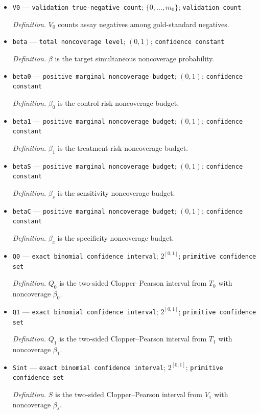 \documentclass{article}
\begin{document}
\begin{itemize}
  \item \texttt{V0} --- \texttt{validation true-\allowbreak{}negative count}; \(\{0,\ldots,m_0\}\); \texttt{validation count}
  \par\smallskip\noindent\emph{Definition.} \(V_0\) counts assay negatives among gold-standard negatives.
  \item \texttt{beta} --- \texttt{total noncoverage level}; \((0,1)\); \texttt{confidence constant}
  \par\smallskip\noindent\emph{Definition.} \(\beta\) is the target simultaneous noncoverage probability.
  \item \texttt{beta0} --- \texttt{positive marginal noncoverage budget}; \((0,1)\); \texttt{confidence constant}
  \par\smallskip\noindent\emph{Definition.} \(\beta_0\) is the control-risk noncoverage budget.
  \item \texttt{beta1} --- \texttt{positive marginal noncoverage budget}; \((0,1)\); \texttt{confidence constant}
  \par\smallskip\noindent\emph{Definition.} \(\beta_1\) is the treatment-risk noncoverage budget.
  \item \texttt{betaS} --- \texttt{positive marginal noncoverage budget}; \((0,1)\); \texttt{confidence constant}
  \par\smallskip\noindent\emph{Definition.} \(\beta_s\) is the sensitivity noncoverage budget.
  \item \texttt{betaC} --- \texttt{positive marginal noncoverage budget}; \((0,1)\); \texttt{confidence constant}
  \par\smallskip\noindent\emph{Definition.} \(\beta_c\) is the specificity noncoverage budget.
  \item \texttt{Q0} --- \texttt{exact binomial confidence interval}; \(2^{[0,1]}\); \texttt{primitive confidence set}
  \par\smallskip\noindent\emph{Definition.} \(Q_0\) is the two-sided Clopper--Pearson interval from \(T_0\) with noncoverage \(\beta_0\).
  \item \texttt{Q1} --- \texttt{exact binomial confidence interval}; \(2^{[0,1]}\); \texttt{primitive confidence set}
  \par\smallskip\noindent\emph{Definition.} \(Q_1\) is the two-sided Clopper--Pearson interval from \(T_1\) with noncoverage \(\beta_1\).
  \item \texttt{Sint} --- \texttt{exact binomial confidence interval}; \(2^{[0,1]}\); \texttt{primitive confidence set}
  \par\smallskip\noindent\emph{Definition.} \(S\) is the two-sided Clopper--Pearson interval from \(V_1\) with noncoverage \(\beta_s\).

\end{itemize}
\end{document}
